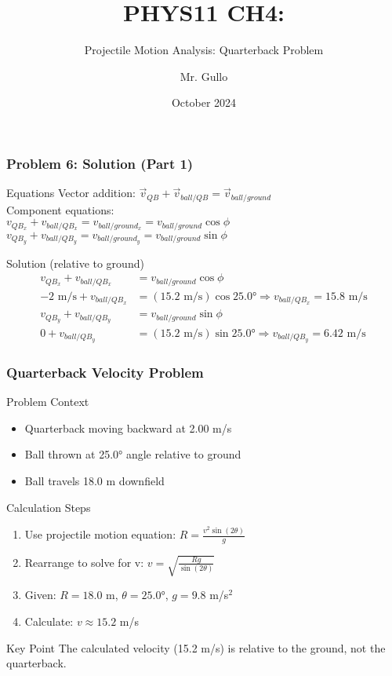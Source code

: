 \documentclass{beamer}
\begin{document}
\begin{frame}
\frametitle{Problem 6: Solution (Part 1)}
\begin{block}{Equations}
Vector addition: $\vec{v}_{QB} + \vec{v}_{ball/QB} = \vec{v}_{ball/ground}$\\
Component equations:\\ 
$v_{QB_x} + v_{ball/QB_x} = v_{ball/ground_x} = v_{ball/ground} \cos \phi$\\
$v_{QB_y} + v_{ball/QB_y} = v_{ball/ground_y} = v_{ball/ground} \sin \phi$
\end{block}
\begin{block}{Solution}
(relative to ground)
\begin{align*}
v_{QB_x} + v_{ball/QB_x} &= v_{ball/ground} \cos \phi \\
-2 \text{ m/s} + v_{ball/QB_x} &= (15.2 \text{ m/s}) \cos 25.0° \Rightarrow v_{ball/QB_x} = 15.8 \text{ m/s}\\
v_{QB_y} + v_{ball/QB_y} &= v_{ball/ground} \sin \phi \\
0 + v_{ball/QB_y} &= (15.2 \text{ m/s}) \sin 25.0° \Rightarrow v_{ball/QB_y} = 6.42 \text{ m/s}
\end{align*}
\end{block}
\end{frame}

\title[Projectile Motion Analysis]{PHYS11 CH4:}
\subtitle{Projectile Motion Analysis: Quarterback Problem}
\author[Mr. Gullo]{Mr. Gullo}
\date[Oct 2024]{October 2024}


\begin{frame}
\frametitle{Quarterback Velocity Problem}
\begin{block}{Problem Context}
\begin{itemize}
    \item Quarterback moving backward at 2.00 m/s
    \item Ball thrown at 25.0° angle relative to ground
    \item Ball travels 18.0 m downfield
\end{itemize}
\end{block}

\begin{block}{Calculation Steps}
\begin{enumerate}
    \item Use projectile motion equation: $R = \frac{v^2 \sin(2\theta)}{g}$
    \item Rearrange to solve for v: $v = \sqrt{\frac{R g}{\sin(2\theta)}}$
    \item Given: $R = 18.0$ m, $\theta = 25.0°$, $g = 9.8$ m/s$^2$
    \item Calculate: $v \approx 15.2$ m/s
\end{enumerate}
\end{block}

\begin{alertblock}{Key Point}
The calculated velocity (15.2 m/s) is relative to the ground, not the quarterback.
\end{alertblock}
\end{frame}
\end{document}
